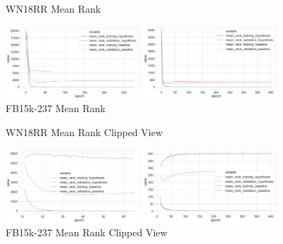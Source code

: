 \begin{figure}[H]
	\parbox{.5\linewidth}{
   		\caption{WN18RR Mean Rank}
   		\centering
    		\includegraphics[width=0.45\textwidth, height=0.2\textheight]{WN18RR_mean_rank_Results}
		}
	\hfill
	\parbox{.5\linewidth}{
		\caption{FB15k-237 Mean Rank}
   		\centering
		\includegraphics[width=0.45\textwidth, height=0.2\textheight]{FB15k-237_mean_rank_Results}
		}
\end{figure}

\begin{figure}[H]
	\parbox{.5\linewidth}{
   		\caption{WN18RR Mean Rank Clipped View}
   		\centering
    		\includegraphics[width=0.45\textwidth, height=0.2\textheight]{WN18RR_mean_rank_Results_Clipped}
		}
	\hfill
	\parbox{.5\linewidth}{
		\caption{FB15k-237 Mean Rank Clipped View}
   		\centering
		\includegraphics[width=0.45\textwidth, height=0.2\textheight]{FB15k-237_mean_rank_Results_Clipped}
		}
\end{figure}


